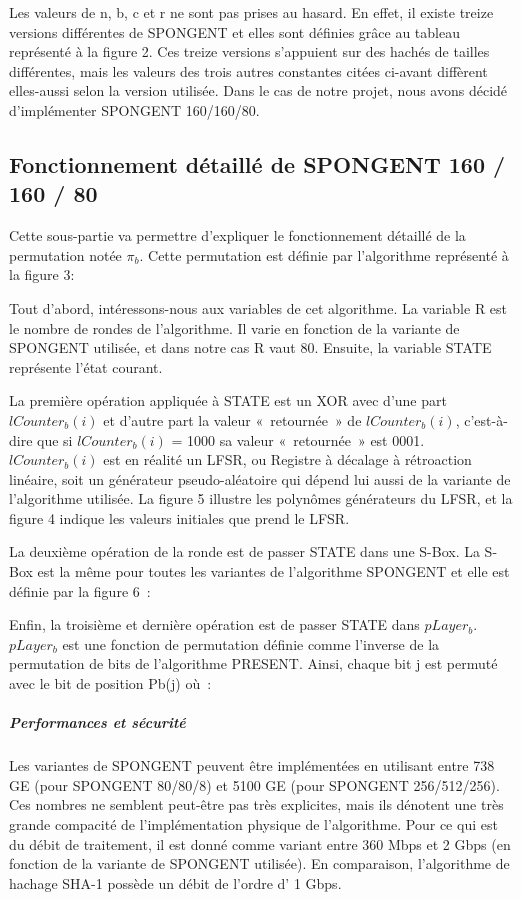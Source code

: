 			Les valeurs de n, b, c et r ne sont pas prises au hasard. En effet, il
		existe treize versions différentes de SPONGENT et elles sont définies grâce
		au tableau représenté à la figure 2. Ces treize versions s’appuient sur des
		hachés de tailles différentes, mais les valeurs des trois autres constantes
		citées ci-avant diffèrent elles-aussi selon la version utilisée. Dans le
		cas de notre projet, nous avons décidé d’implémenter SPONGENT 160/160/80.

		\subsection{Fonctionnement détaillé de SPONGENT 160 / 160 / 80}

		 Cette sous-partie va permettre d’expliquer le fonctionnement détaillé de
		la permutation notée $\pi_b$. Cette permutation est définie par l’algorithme
		représenté à la figure 3:


			Tout d’abord, intéressons-nous aux variables de cet algorithme. La
		variable R est le nombre de rondes de l’algorithme. Il varie en fonction de
		la variante de SPONGENT utilisée, et dans notre cas R vaut 80. Ensuite, la
		variable STATE représente l’état courant.


			La première opération appliquée à STATE est un XOR avec d’une part
		$lCounter_b(i)$ et d’autre part la valeur « retournée » de $lCounter_b(i)$,
		c’est-à-dire que si $lCounter_b(i)$ = 1000 sa valeur « retournée » est 0001.
		$lCounter_b(i)$ est en réalité un LFSR, ou Registre à décalage à rétroaction
		linéaire, soit un générateur pseudo-aléatoire qui dépend lui aussi de la
		variante de l’algorithme utilisée. La figure 5 illustre les polynômes
		générateurs du LFSR, et la figure 4 indique les valeurs initiales que prend
		le LFSR.

			La deuxième opération de la ronde est de passer STATE dans une S-Box. La
		S-Box est la même pour toutes les variantes de l’algorithme SPONGENT et
		elle est définie par la figure 6 :

			Enfin, la troisième et dernière opération est de passer STATE dans
		$pLayer_b$. $pLayer_b$ est une fonction de permutation définie comme l’inverse de
		la permutation de bits de l’algorithme PRESENT. Ainsi, chaque bit j est
		permuté avec le bit de position Pb(j) où :

		\subparagraph{Performances et sécurité}

				Les variantes de SPONGENT peuvent être implémentées en utilisant entre
			738 GE (pour SPONGENT 80/80/8) et 5100 GE (pour SPONGENT 256/512/256).
			Ces nombres ne semblent peut-être pas très explicites, mais ils dénotent
			une très grande compacité de l’implémentation physique de l’algorithme.
			Pour ce qui est du débit de traitement, il est donné comme variant entre
			360 Mbps et 2 Gbps (en fonction de la variante de SPONGENT utilisée). En
			comparaison, l’algorithme de hachage SHA-1 possède un débit de l’ordre d’
			1 Gbps.

